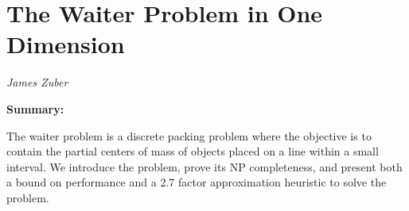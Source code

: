 \documentclass[phd,tbottom,tnosig]{Athesis}
\begin{document}
\chapter{The Waiter Problem in One Dimension}{
\begin{centering}
\par{\it James Zuber}

\par{\large \bf Summary:}

\end{centering}

\par{The waiter problem is a discrete packing problem where the objective is to contain the partial centers of mass of objects placed on a line within a small interval. We introduce the problem, prove its NP completeness, and present both a bound on performance and a 2.7 factor approximation heuristic to solve the problem.}
}






\end{document}

